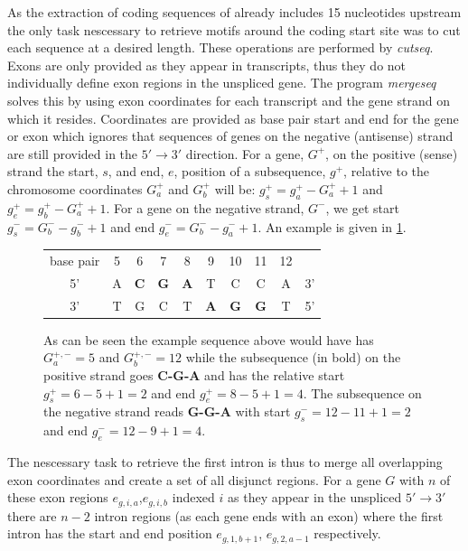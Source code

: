 \documentclass[10pt,letterpaper]{article}
\begin{document}
As the extraction of coding sequences of already includes 15 nucleotides upstream the only task nescessary to retrieve motifs around the coding start site was to cut each sequence at a desired length. These operations are performed by \textit{cutseq}. Exons are only provided as they appear in transcripts, thus they do not individually define exon regions in the unspliced gene. The program \textit{mergeseq} solves this by using exon coordinates for each transcript and the gene strand on which it resides. Coordinates are provided as base pair start and end for the gene or exon which ignores that sequences of genes on the negative (antisense) strand are still provided in the $5'\rightarrow 3'$ direction. For a gene, $G^+$, on the positive (sense) strand the start, $s$, and end, $e$, position of a subsequence, $g^+$, relative to the chromosome coordinates $G^+_a$ and $G^+_b$ will be: $g^+_s = g^+_a - G^+_a+1$ and $g^+_e = g^+_b - G^+_a+1$. For a gene on the negative strand, $G^-$, we get start $g^-_s = G^-_b - g^-_b+1$ and end $g^-_e = G^-_b - g^-_a+1$. An example is given in \ref{figGene}.
\begin{figure}[h]
\begin{center}
\begin{tabular}{c c c c c c c c c c}
base pair & 5 & 6 & 7 & 8 & 9 & 10 & 11 & 12 & \\
5' & A & \textbf{C} & \textbf{G} & \textbf{A} & T & C & C & A & 3'\\
3' & T & G & C & T & \textbf{A} & \textbf{G} & \textbf{G} & T & 5'\\
\end{tabular}
\end{center}
\caption{As can be seen the example sequence above would have has $G^{+,-}_a=5$ and $G^{+,-}_b=12$ while the subsequence (in bold) on the positive strand goes \textbf{C-G-A} and has the relative start $g^+_s = 6-5+1 = 2$ and end $g^+_e=8-5+1=4$. The subsequence on the negative strand reads \textbf{G-G-A} with start $g^-_s=12-11+1=2$ and end $g^-_e=12-9+1=4$.}
\label{figGene}
\end{figure}

The nescessary task to retrieve the first intron is thus to merge all overlapping exon coordinates and create a set of all disjunct regions. For a gene $G$ with $n$ of these exon regions $e_{g,i,a}$,$ e_{g,i,b}$ indexed $i$ as they appear in the unspliced $5'\rightarrow 3'$ there are $n-2$ intron regions (as each gene ends with an exon) where the first intron has the start and end position $e_{g,1,b+1}$, $e_{g,2,a-1}$ respectively.
\end{document}
